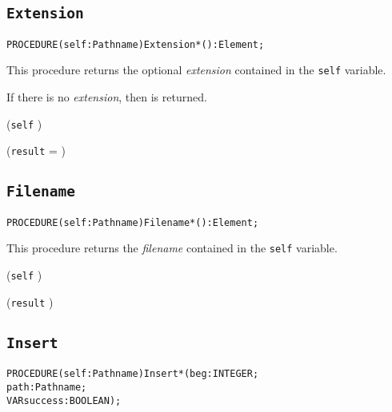 \subsection{\texttt{Extension}}\label{pathnames:extension}
\begin{alltt}
  PROCEDURE (self : Pathname) Extension*() : Element;
\end{alltt}

\begin{semantics}
  This procedure returns the optional \emph{extension} contained in the
  \texttt{self} variable.

  If there is no \emph{extension}, then \nil is returned.
\end{semantics}

\begin{precondition}
(\texttt{self} \neq \nil) \logicaland {}
\end{precondition}

\begin{postcondition}
(\texttt{result} = \nil) \logicalor {}
\end{postcondition}


\subsection{\texttt{Filename}}\label{pathnames:filename}
\begin{alltt}
  PROCEDURE (self : Pathname) Filename*() : Element;
\end{alltt}

\begin{semantics}
  This procedure returns the \emph{filename} contained in the
  \texttt{self} variable.
\end{semantics}

\begin{precondition}
(\texttt{self} \neq \nil) \logicaland {}
\end{precondition}

\begin{postcondition}
(\texttt{result} \neq \nil) \logicaland {}
\end{postcondition}


\subsection{\texttt{Insert}}\label{pathnames:insert}
\begin{alltt}
  PROCEDURE (self : Pathname) Insert*(beg        : INTEGER;
                                      path        : Pathname;
                                      VAR success : BOOLEAN);
\end{alltt}

